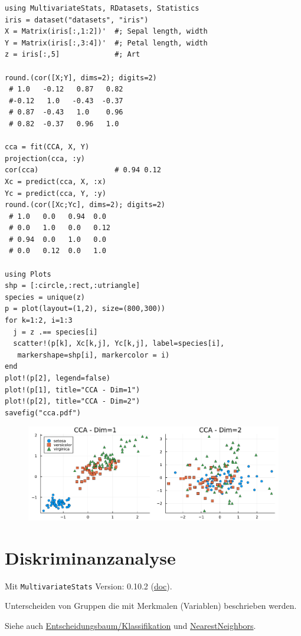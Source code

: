 \documentclass[10pt,twocolumn]{scrartcl}
\begin{document}
\begin{lstlisting}
using MultivariateStats, RDatasets, Statistics
iris = dataset("datasets", "iris")
X = Matrix(iris[:,1:2])'  #; Sepal length, width
Y = Matrix(iris[:,3:4])'  #; Petal length, width
z = iris[:,5]             #; Art

round.(cor([X;Y], dims=2); digits=2)
 # 1.0   -0.12   0.87   0.82
 #-0.12   1.0   -0.43  -0.37
 # 0.87  -0.43   1.0    0.96
 # 0.82  -0.37   0.96   1.0

cca = fit(CCA, X, Y)
projection(cca, :y)
cor(cca)                  # 0.94 0.12
Xc = predict(cca, X, :x)
Yc = predict(cca, Y, :y)
round.(cor([Xc;Yc], dims=2); digits=2)
 # 1.0   0.0   0.94  0.0
 # 0.0   1.0   0.0   0.12
 # 0.94  0.0   1.0   0.0
 # 0.0   0.12  0.0   1.0

using Plots
shp = [:circle,:rect,:utriangle]
species = unique(z)
p = plot(layout=(1,2), size=(800,300))
for k=1:2, i=1:3
  j = z .== species[i]
  scatter!(p[k], Xc[k,j], Yc[k,j], label=species[i],
   markershape=shp[i], markercolor = i)
end
plot!(p[2], legend=false)
plot!(p[1], title="CCA - Dim=1")
plot!(p[2], title="CCA - Dim=2")
savefig("cca.pdf")
\end{lstlisting}

\begin{figure}[ht]
  \centering
  \includegraphics[width=.95\columnwidth]{cca.pdf}
\end{figure}

\section{Diskriminanzanalyse}

Mit \lstinline|MultivariateStats| Version: 0.10.2
(\href{https://juliastats.org/MultivariateStats.jl/stable/lda/}{doc}).

Unterscheiden von Gruppen die mit Merkmalen (Variablen) beschrieben werden.

Siehe auch
\hyperref[ssec:EntscheidungsbaumKlassifikation]{Entscheidungsbaum/Klassifikation}
und \hyperref[sec:NearestNeighbors]{NearestNeighbors}.
\end{document}
